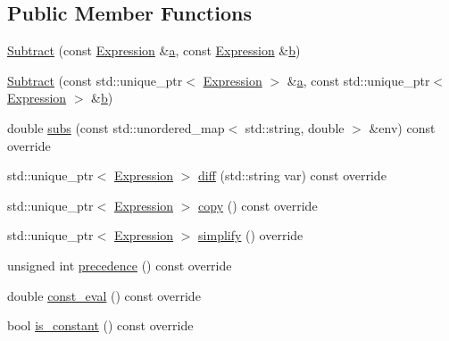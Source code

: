 \subsection*{Public Member Functions}
\begin{DoxyCompactItemize}
\item 
\mbox{\hyperlink{classsymcpp_1_1Subtract_ab77cda12501d9e57a2346eea44e578e2}{Subtract}} (const \mbox{\hyperlink{classsymcpp_1_1Expression}{Expression}} \&\mbox{\hyperlink{classsymcpp_1_1Subtract_a3ef44b38ab098faab493079d994d35ba}{a}}, const \mbox{\hyperlink{classsymcpp_1_1Expression}{Expression}} \&\mbox{\hyperlink{classsymcpp_1_1Subtract_ac5c9bd87c3554a20d9bf12f5a53a9613}{b}})
\item 
\mbox{\hyperlink{classsymcpp_1_1Subtract_a30ad18aceec0bdc15756d2618a8ed6e4}{Subtract}} (const std\+::unique\+\_\+ptr$<$ \mbox{\hyperlink{classsymcpp_1_1Expression}{Expression}} $>$ \&\mbox{\hyperlink{classsymcpp_1_1Subtract_a3ef44b38ab098faab493079d994d35ba}{a}}, const std\+::unique\+\_\+ptr$<$ \mbox{\hyperlink{classsymcpp_1_1Expression}{Expression}} $>$ \&\mbox{\hyperlink{classsymcpp_1_1Subtract_ac5c9bd87c3554a20d9bf12f5a53a9613}{b}})
\item 
double \mbox{\hyperlink{classsymcpp_1_1Subtract_a35a24632dfacadb23e4177a539e7c1df}{subs}} (const std\+::unordered\+\_\+map$<$ std\+::string, double $>$ \&env) const override
\item 
std\+::unique\+\_\+ptr$<$ \mbox{\hyperlink{classsymcpp_1_1Expression}{Expression}} $>$ \mbox{\hyperlink{classsymcpp_1_1Subtract_a4f9040e23694efcf093bf4b5c59b386b}{diff}} (std\+::string var) const override
\item 
std\+::unique\+\_\+ptr$<$ \mbox{\hyperlink{classsymcpp_1_1Expression}{Expression}} $>$ \mbox{\hyperlink{classsymcpp_1_1Subtract_a97b707b4c72caa44342fe7952d616a4d}{copy}} () const override
\item 
std\+::unique\+\_\+ptr$<$ \mbox{\hyperlink{classsymcpp_1_1Expression}{Expression}} $>$ \mbox{\hyperlink{classsymcpp_1_1Subtract_a3d3b5586c41dbbee1071a08db5725ecc}{simplify}} () override
\item 
unsigned int \mbox{\hyperlink{classsymcpp_1_1Subtract_ac0b20c29aac75772aeb226eec86ffc22}{precedence}} () const override
\item 
double \mbox{\hyperlink{classsymcpp_1_1Subtract_a619e8733e2b9c07f9bcdb1c82781fad9}{const\+\_\+eval}} () const override
\item 
bool \mbox{\hyperlink{classsymcpp_1_1Subtract_a651ca7fc5e804970141b65813e738463}{is\+\_\+constant}} () const override
\end{DoxyCompactItemize}
